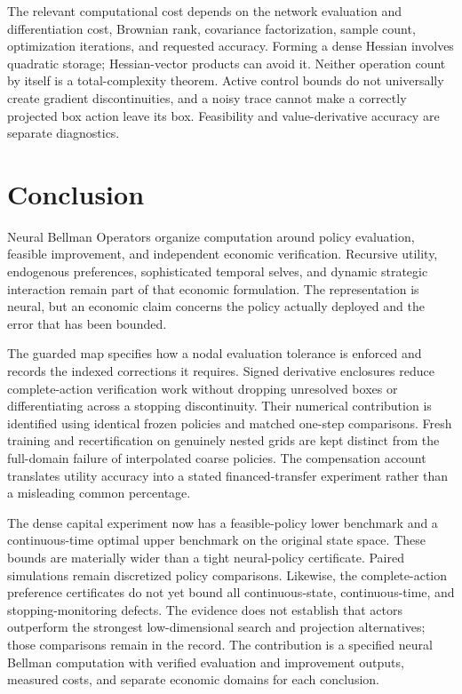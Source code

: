\documentclass[ecta,draft]{econsocart}
\theoremstyle{definition}
\theoremstyle{remark}
\begin{document}
The relevant computational cost depends on the network evaluation and differentiation cost, Brownian rank, covariance factorization, sample count, optimization iterations, and requested accuracy. Forming a dense Hessian involves quadratic storage; Hessian-vector products can avoid it. Neither operation count by itself is a total-complexity theorem. Active control bounds do not universally create gradient discontinuities, and a noisy trace cannot make a correctly projected box action leave its box. Feasibility and value-derivative accuracy are separate diagnostics.





\section{Conclusion}\label{sec:conclusion}
Neural Bellman Operators organize computation around policy evaluation, feasible improvement, and independent economic verification. Recursive utility, endogenous preferences, sophisticated temporal selves, and dynamic strategic interaction remain part of that economic formulation. The representation is neural, but an economic claim concerns the policy actually deployed and the error that has been bounded.

The guarded map specifies how a nodal evaluation tolerance is enforced and records the indexed corrections it requires. Signed derivative enclosures reduce complete-action verification work without dropping unresolved boxes or differentiating across a stopping discontinuity. Their numerical contribution is identified using identical frozen policies and matched one-step comparisons. Fresh training and recertification on genuinely nested grids are kept distinct from the full-domain failure of interpolated coarse policies. The compensation account translates utility accuracy into a stated financed-transfer experiment rather than a misleading common percentage.

The dense capital experiment now has a feasible-policy lower benchmark and a continuous-time optimal upper benchmark on the original state space. These bounds are materially wider than a tight neural-policy certificate. Paired simulations remain discretized policy comparisons. Likewise, the complete-action preference certificates do not yet bound all continuous-state, continuous-time, and stopping-monitoring defects. The evidence does not establish that actors outperform the strongest low-dimensional search and projection alternatives; those comparisons remain in the record. The contribution is a specified neural Bellman computation with verified evaluation and improvement outputs, measured costs, and separate economic domains for each conclusion.
\end{document}
